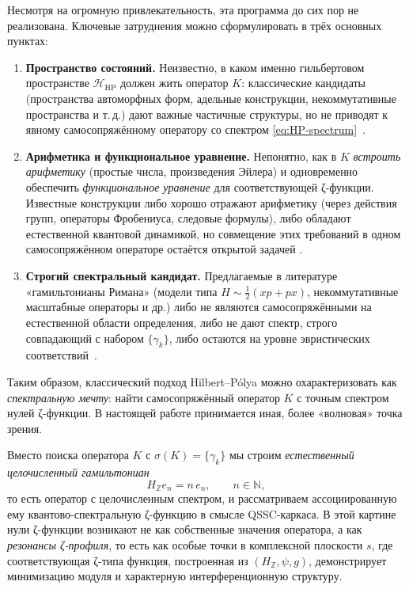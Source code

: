 \documentclass{article}
\numberwithin{equation}{section}
\theoremstyle{plain}
\theoremstyle{definition}
\theoremstyle{remark}
\begin{document}
\medskip

\noindent
Несмотря на огромную привлекательность, эта программа до сих пор не реализована.
Ключевые затруднения можно сформулировать в трёх основных пунктах:
\begin{enumerate}[label=(\roman*), leftmargin=2.3em]
  \item \textbf{Пространство состояний.}
  Неизвестно, в каком именно гильбертовом пространстве $\mathcal H_{\mathrm{HP}}$
  должен жить оператор $K$:
  классические кандидаты (пространства автоморфных форм, адельные конструкции,
  некоммутативные пространства и т.\,д.) дают важные частичные структуры,
  но не приводят к явному самосопряжённому оператору со спектром
  \eqref{eq:HP-spectrum}~\cite{Connes1999,ConnesMarcolli2008}.

  \item \textbf{Арифметика и функциональное уравнение.}
  Непонятно, как в $K$ \emph{встроить арифметику} (простые числа, произведения Эйлера)
  и одновременно обеспечить \emph{функциональное уравнение} для соответствующей ζ-функции.
  Известные конструкции либо хорошо отражают арифметику (через действия групп,
  операторы Фробениуса, следовые формулы), либо обладают естественной квантовой динамикой,
  но совмещение этих требований в одном самосопряжённом операторе остаётся открытой задачей
  \cite{IwaniecKowalski2004,Steuding2007}.

  \item \textbf{Строгий спектральный кандидат.}
  Предлагаемые в литературе «гамильтонианы Римана»
  (модели типа $H\sim\tfrac12(xp+px)$, некоммутативные масштабные операторы и др.) 
  либо не являются самосопряжёнными на естественной области определения,
  либо не дают спектр, строго совпадающий с набором $\{\gamma_k\}$,
  либо остаются на уровне эвристических соответствий~\cite{BerryKeating1999,SierraTownsend2008}.
\end{enumerate}

\medskip

\noindent
Таким образом, классический подход Hilbert--Pólya можно охарактеризовать как
\emph{спектральную мечту}: найти самосопряжённый оператор $K$ с точным спектром нулей ζ-функции.
В настоящей работе принимается иная, более «волновая» точка зрения.

\medskip

\noindent
Вместо поиска оператора $K$ с $\sigma(K)=\{\gamma_k\}$ мы строим \emph{естественный целочисленный
гамильтониан}
\begin{equation}
H_{\mathbb Z} e_n = n\,e_n,
\qquad n\in\mathbb N,
\label{eq:HZ-intro}
\end{equation}
то есть оператор с целочисленным спектром, и рассматриваем ассоциированную ему
квантово-спектральную ζ-функцию в смысле QSSC-каркаса.
В этой картине нули ζ-функции возникают не как собственные значения оператора,
а как \emph{резонансы ζ-профиля}, то есть как особые точки в комплексной плоскости $s$,
где соответствующая ζ-типа функция, построенная из $(H_{\mathbb Z},\psi,g)$,
демонстрирует минимизацию модуля и характерную интерференционную структуру.
\end{document}
